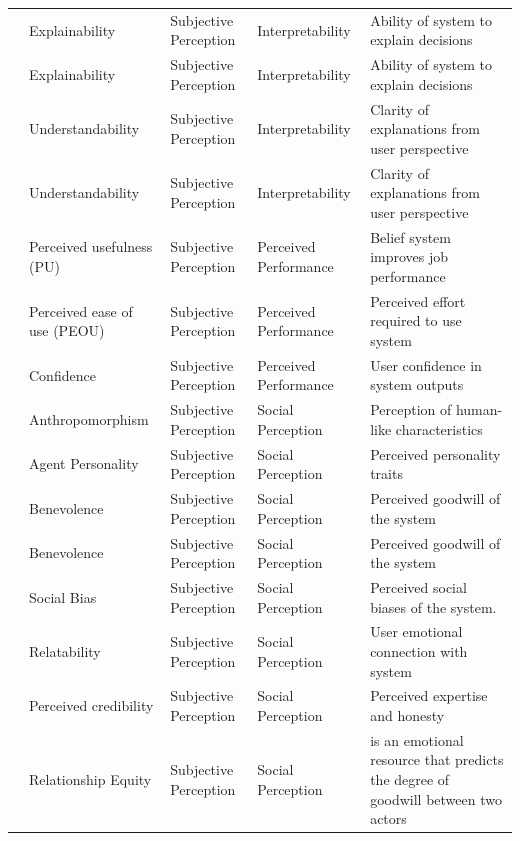 \begin{longtable}{l l l l p{4cm}}
\cite{afroogh_trust_in_ai} & Explainability & Subjective Perception & Interpretability & Ability of system to explain decisions \\
\cite{Graaf_Malle_2017} & Explainability & Subjective Perception & Interpretability & Ability of system to explain decisions \\
\cite{naiseh_2023_class} & Understandability & Subjective Perception & Interpretability & Clarity of explanations from user perspective \\
\cite{Vaithilingam_Zhang_Glassman_2022} & Understandability & Subjective Perception & Interpretability & Clarity of explanations from user perspective \\
\cite{zhang_automated_vehicle_acceptance} & Perceived usefulness (PU) & Subjective Perception & Perceived Performance & Belief system improves job performance \\
\cite{zhang_automated_vehicle_acceptance} & Perceived ease of use (PEOU) & Subjective Perception & Perceived Performance & Perceived effort required to use system \\
\cite{hayes2017improving} & Confidence & Subjective Perception & Perceived Performance & User confidence in system outputs \\
\cite{chi_formative_scale} & Anthropomorphism & Subjective Perception & Social Perception & Perception of human-like characteristics \\
\cite{Rheuetal.2020.SystematicReviewTrustBuildingFactors} & Agent Personality & Subjective Perception & Social Perception & Perceived personality traits \\
\cite{yang_wibowo_2022} & Benevolence & Subjective Perception & Social Perception & Perceived goodwill of the system \\
\cite{afroogh_trust_in_ai} & Benevolence & Subjective Perception & Social Perception & Perceived goodwill of the system \\
\cite{afroogh_trust_in_ai} & Social Bias & Subjective Perception & Social Perception & Perceived social biases of the system. \\
\cite{bach_systematic_literature_review} & Relatability & Subjective Perception & Social Perception & User emotional connection with system \\
\cite{bach_systematic_literature_review} & Perceived credibility & Subjective Perception & Social Perception & Perceived expertise and honesty \\
\cite{de_visser_longitudinal_trust} & Relationship Equity & Subjective Perception & Social Perception & is an emotional resource that predicts the degree of goodwill between two actors \\

\end{longtable}
